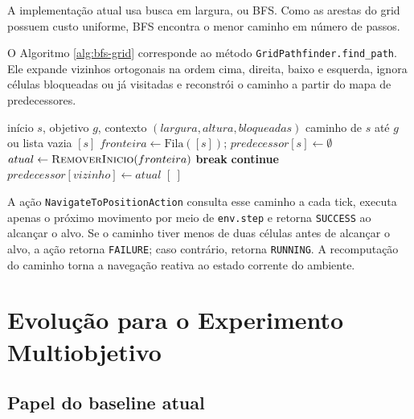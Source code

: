 A implementação atual usa busca em largura, ou BFS. Como as arestas do grid
possuem custo uniforme, BFS encontra o menor caminho em número de passos.

O Algoritmo \ref{alg:bfs-grid} corresponde ao método
\texttt{GridPathfinder.find\_path}. Ele expande vizinhos ortogonais na ordem
cima, direita, baixo e esquerda, ignora células bloqueadas ou já visitadas e
reconstrói o caminho a partir do mapa de predecessores.

\begin{algorithm}[H]
\caption{Método \texttt{find\_path} por busca em largura}
\label{alg:bfs-grid}
\begin{algorithmic}[1]
\Require início $s$, objetivo $g$, contexto $(largura,altura,bloqueadas)$
\Ensure caminho de $s$ até $g$ ou lista vazia
  \State \Return $[s]$
\EndIf
\State $fronteira \gets \mathrm{Fila}([s])$; $predecessor[s] \gets \emptyset$
  \State $atual \gets \Call{RemoverInicio}{fronteira}$
    \State \textbf{break}
  \EndIf
      \State \textbf{continue}
    \EndIf
    \State $predecessor[vizinho] \gets atual$
    \State {}
  \EndFor
\EndWhile
{}
  \State \Return $[\ ]$
\EndIf
\State \Return {}
\end{algorithmic}
\end{algorithm}

A ação \texttt{NavigateToPositionAction} consulta esse caminho a cada tick,
executa apenas o próximo movimento por meio de \texttt{env.step} e retorna
\texttt{SUCCESS} ao alcançar o alvo. Se o caminho tiver menos de duas células
antes de alcançar o alvo, a ação retorna \texttt{FAILURE}; caso contrário,
retorna \texttt{RUNNING}. A recomputação do caminho torna a navegação reativa
ao estado corrente do ambiente.

\chapter{Evolução para o Experimento Multiobjetivo}

\section{Papel do baseline atual}

